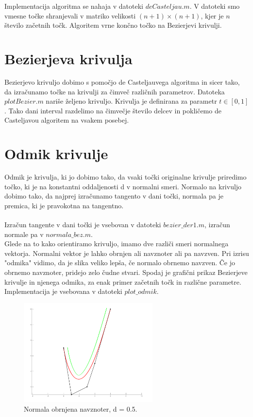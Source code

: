 \documentclass{article}
\begin{document}
Implementacija algoritma se nahaja v datoteki $deCasteljau.m$.
V datoteki smo vmesne točke shranjevali v matriko velikosti $(n+1)\times(n+1)$, kjer je $n$ število začetnih točk. Algoritem vrne končno točko na Bezierjevi krivulji.


\section{Bezierjeva krivulja}
Bezierjevo krivuljo dobimo s pomočjo de Casteljauvega algoritma in sicer tako, da izračunamo točke na krivulji za čimveč različnih parametrov. 
Datoteka $plotBezier.m$ nariše željeno krivuljo. Krivulja je definirana za parametr $t\in [0,1]$. Tako dani interval razdelimo na čimvečje število delcev in pokličemo de Casteljavou algoritem na vsakem posebej.


\section{Odmik krivulje}
Odmik je krivulja, ki jo dobimo tako, da vsaki točki originalne krivulje
priredimo točko, ki je na konstantni oddaljenosti d v normalni smeri.
Normalo na krivuljo dobimo tako, da najprej izračunamo tangento v dani točki, normala pa je premica, ki je pravokotna na tangentno.\\
\\
Izračun tangente v dani točki je vsebovan v datoteki $bezier\_der1.m$, izračun normale pa v $normala\_bez.m$. \\
Glede na to kako orientiramo krivuljo, imamo dve različi smeri normalnega vektorja. Normalni vektor je lahko obrnjen ali navznoter ali pa navzven. Pri izrisu "odmika" vidimo, da je slika veliko lepša, če normalo obrnemo navzven. Če jo obrnemo navznoter, pridejo zelo čudne stvari.
Spodaj je grafični prikaz Bezierjeve krivulje in njenega odmika, za enak primer začetnih točk in različne parametre.\\
Implementacija je vsebovana v datoteki $plot\_odmik$.
\newpage
 \begin{figure}[!ht]
\centering
       \includegraphics[width=70mm]{odmik1.png}
	\caption{Normala obrnjena navznoter, d = 0.5.}
\end{figure}
\end{document}
